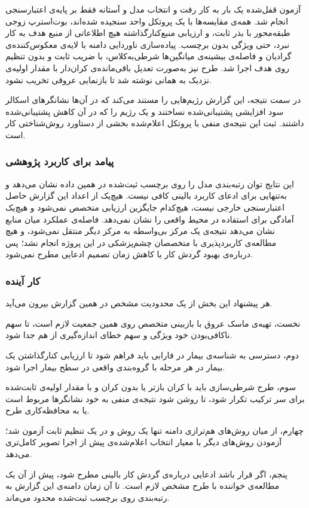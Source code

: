 آزمون قفل‌شده یک بار به کار رفت و انتخاب مدل و آستانه فقط بر پایه‌ی اعتبارسنجی انجام شد. همه‌ی مقایسه‌ها با یک پروتکل واحد سنجیده شده‌اند، بوت‌استرپ زوجی طبقه‌محور با بذر ثابت، و ارزیابی منبع‌کنارگذاشته هیچ اطلاعاتی از منبع هدف به کار نبرد، حتی ویژگی بدون برچسب. پیاده‌سازی ناوردایی دامنه با لایه‌ی معکوس‌کننده‌ی گرادیان و فاصله‌ی بیشینه‌ی میانگین‌ها شرطی‌به‌کلاس، با ضریب ثابت و بدون تنظیم روی هدف اجرا شد. طرح  نیز به‌صورت تعدیل باقی‌مانده‌ی کران‌دار با مقدار اولیه‌ی نزدیک به همانی نوشته شد تا بازنمایی عروقی تخریب نشود.

در سمت نتیجه، این گزارش رژیم‌هایی را مستند می‌کند که در آن‌ها نشانگرهای اسکالر سود افزایشی پشتیبانی‌شده نساختند و یک رژیم را که در آن کاهش پشتیبانی‌شده داشتند. ثبت این نتیجه‌ی منفی با پروتکل اعلام‌شده بخشی از دستاورد روش‌شناختی کار است.

\subsubsection{پیامد برای کاربرد پژوهشی}

این نتایج توان رتبه‌بندی مدل را روی برچسب ثبت‌شده در همین داده نشان می‌دهد و به‌تنهایی برای ادعای کاربرد بالینی کافی نیست. هیچ‌یک از اعداد این گزارش حاصل اعتبارسنجی خارجی نیست، هیچ‌کدام جایگزین ارزیابی متخصص نمی‌شود و هیچ‌یک آمادگی برای استفاده در محیط واقعی را نشان نمی‌دهد. فاصله‌ی عملکرد میان منابع نشان می‌دهد نتیجه‌ی یک مرکز بی‌واسطه به مرکز دیگر منتقل نمی‌شود، و هیچ مطالعه‌ی کاربردپذیری با متخصصان چشم‌پزشکی در این پروژه انجام نشد؛ پس درباره‌ی بهبود گردش کار یا کاهش زمان تصمیم ادعایی مطرح نمی‌شود.

\subsubsection{کار آینده}

هر پیشنهاد این بخش از یک محدودیت مشخص در همین گزارش بیرون می‌آید.

نخست، تهیه‌ی ماسک عروق با بازبینی متخصص روی همین جمعیت لازم است، تا سهم ناکافی‌بودن خود ویژگی و سهم خطای اندازه‌گیری از هم جدا شود.

دوم، دسترسی به شناسه‌ی بیمار در فارابی باید فراهم شود تا ارزیابی کنارگذاشتن یک بیمار در هر مرحله با گروه‌بندی واقعی در سطح بیمار اجرا شود.

سوم، طرح شرطی‌سازی باید با کران بازتر یا بدون کران و با مقدار اولیه‌ی ثابت‌شده برای سر ترکیب تکرار شود، تا روشن شود نتیجه‌ی منفی  به خود نشانگرها مربوط است یا به محافظه‌کاری طرح.

چهارم، از میان روش‌های هم‌ترازی دامنه تنها یک روش و در یک تنظیم ثابت آزمون شد؛ آزمودن روش‌های دیگر با معیار انتخاب اعلام‌شده‌ی پیش از اجرا تصویر کامل‌تری می‌دهد.

پنجم، اگر قرار باشد ادعایی درباره‌ی گردش کار بالینی مطرح شود، پیش از آن یک مطالعه‌ی خواننده با طرح مشخص لازم است. تا آن زمان دامنه‌ی این گزارش به رتبه‌بندی روی برچسب ثبت‌شده محدود می‌ماند.
